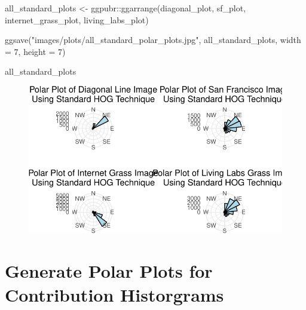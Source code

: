 \documentclass[
  letterpaper,
]{report}
\newenvironment{Shaded}{\begin{snugshade}}{\end{snugshade}}
\newcommand{\AttributeTok}[1]{\textcolor[rgb]{0.40,0.45,0.13}{#1}}
\newcommand{\DecValTok}[1]{\textcolor[rgb]{0.68,0.00,0.00}{#1}}
\newcommand{\FunctionTok}[1]{\textcolor[rgb]{0.28,0.35,0.67}{#1}}
\newcommand{\NormalTok}[1]{\textcolor[rgb]{0.00,0.23,0.31}{#1}}
\newcommand{\OtherTok}[1]{\textcolor[rgb]{0.00,0.23,0.31}{#1}}
\newcommand{\SpecialCharTok}[1]{\textcolor[rgb]{0.37,0.37,0.37}{#1}}
\newcommand{\StringTok}[1]{\textcolor[rgb]{0.13,0.47,0.30}{#1}}
\begin{document}
\begin{Shaded}
\begin{Highlighting}[]
\NormalTok{all\_standard\_plots }\OtherTok{\textless{}{-}}\NormalTok{ ggpubr}\SpecialCharTok{::}\FunctionTok{ggarrange}\NormalTok{(diagonal\_plot, }
\NormalTok{                                        sf\_plot, }
\NormalTok{                                        internet\_grass\_plot, }
\NormalTok{                                        living\_labs\_plot)}

\FunctionTok{ggsave}\NormalTok{(}\StringTok{"images/plots/all\_standard\_polar\_plots.jpg"}\NormalTok{, }
\NormalTok{       all\_standard\_plots, }\AttributeTok{width =} \DecValTok{7}\NormalTok{, }
       \AttributeTok{height =} \DecValTok{7}\NormalTok{)}

\NormalTok{all\_standard\_plots}
\end{Highlighting}
\end{Shaded}

\begin{figure}[H]

{\centering \includegraphics{results_files/figure-pdf/unnamed-chunk-18-1.pdf}

}

\end{figure}

\hypertarget{generate-polar-plots-for-contribution-historgrams}{%
\section{Generate Polar Plots for Contribution
Historgrams}\label{generate-polar-plots-for-contribution-historgrams}}
\end{document}
